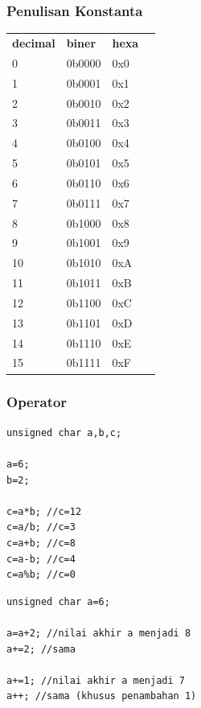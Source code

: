 \documentclass[12pt,]{article}
\begin{document}
	\subsubsection{Penulisan Konstanta}
	\begin{table}[H]
		\begin{tabular}{|l|l|l|l}
			\cline{1-3}
			\textbf{decimal} & \textbf{biner} & \textbf{hexa} \\ \cline{1-3}
			0 & 0b0000 & 0x0  \\ \cline{1-3}
			1 & 0b0001 & 0x1  \\ \cline{1-3}
			2 & 0b0010 & 0x2  \\ \cline{1-3}
			3 & 0b0011 & 0x3  \\ \cline{1-3}
			4 & 0b0100 & 0x4  \\ \cline{1-3}
			5 & 0b0101 & 0x5  \\ \cline{1-3}
			6 & 0b0110 & 0x6  \\ \cline{1-3}
			7 & 0b0111 & 0x7  \\ \cline{1-3}
			8 & 0b1000 & 0x8  \\ \cline{1-3}
			9 & 0b1001 & 0x9  \\ \cline{1-3}
			10 & 0b1010 & 0xA  \\ \cline{1-3}
			11 & 0b1011 & 0xB  \\ \cline{1-3}
			12 & 0b1100 & 0xC  \\ \cline{1-3}
			13 & 0b1101 & 0xD  \\ \cline{1-3}
			14 & 0b1110 & 0xE  \\ \cline{1-3}
			15 & 0b1111 & 0xF  \\ \cline{1-3}
		\end{tabular}
	\end{table}

	\subsubsection{Operator}
	\begin{verbatim}
unsigned char a,b,c;

a=6;
b=2;

c=a*b; //c=12
c=a/b; //c=3
c=a+b; //c=8
c=a-b; //c=4
c=a%b; //c=0
	\end{verbatim}
	
	\begin{verbatim}
unsigned char a=6;

a=a+2; //nilai akhir a menjadi 8
a+=2; //sama

a+=1; //nilai akhir a menjadi 7
a++; //sama (khusus penambahan 1)
	\end{verbatim}
	
\end{document}

